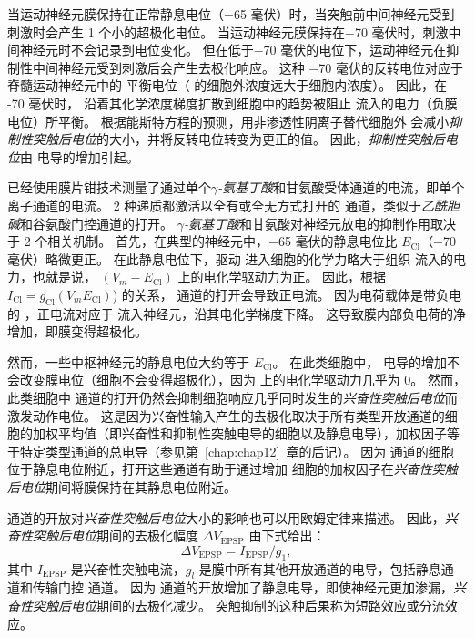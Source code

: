 当运动神经元膜保持在正常静息电位（−65 毫伏）时，当突触前中间神经元受到刺激时会产生 1 个小的超极化电位。
当运动神经元膜保持在−70 毫伏时，刺激中间神经元时不会记录到电位变化。
但在低于−70 毫伏的电位下，运动神经元在抑制性中间神经元受到刺激后会产生去极化响应。
这种 −70 毫伏的反转电位对应于脊髓运动神经元中的  平衡电位（ 的细胞外浓度远大于细胞内浓度）。
因此，在 -70 毫伏时， 沿着其化学浓度梯度扩散到细胞中的趋势被阻止  流入的电力（负膜电位）所平衡。
根据能斯特方程的预测，用非渗透性阴离子替代细胞外  会减小\textit{抑制性突触后电位}的大小，并将反转电位转变为更正的值。
因此，\textit{抑制性突触后电位}由  电导的增加引起。


已经使用膜片钳技术测量了通过单个\textit{$\gamma$-氨基丁酸}和甘氨酸受体通道的电流，即单个离子通道的电流。
2 种递质都激活以全有或全无方式打开的  通道，类似于\textit{乙酰胆碱}和谷氨酸门控通道的打开。
\textit{$\gamma$-氨基丁酸}和甘氨酸对神经元放电的抑制作用取决于 2 个相关机制。
首先，在典型的神经元中，−65 毫伏的静息电位比 $E_\text{Cl}$（−70 毫伏）略微更正。
在此静息电位下，驱动  进入细胞的化学力略大于组织  流入的电力，也就是说， $(V_m - E_\text{Cl})$ 上的电化学驱动力为正。
因此，根据 $ I_\text{Cl} = g_\text{Cl} (V_m E_\text{Cl})$) 的关系， 通道的打开会导致正电流。
因为电荷载体是带负电的 ，正电流对应于  流入神经元，沿其电化学梯度下降。
这导致膜内部负电荷的净增加，即膜变得超极化。


然而，一些中枢神经元的静息电位大约等于 $E_\text{Cl}$。
在此类细胞中， 电导的增加不会改变膜电位（细胞不会变得超极化），因为  上的电化学驱动力几乎为 0。
然而，此类细胞中  通道的打开仍然会抑制细胞响应几乎同时发生的\textit{兴奋性突触后电位}而激发动作电位。
这是因为兴奋性输入产生的去极化取决于所有类型开放通道的细胞的加权平均值（即兴奋性和抑制性突触电导的细胞以及静息电导），加权因子等于特定类型通道的总电导（参见第~\ref{chap:chap12}~章的后记）。
因为  通道的细胞位于静息电位附近，打开这些通道有助于通过增加  细胞的加权因子在\textit{兴奋性突触后电位}期间将膜保持在其静息电位附近。


 通道的开放对\textit{兴奋性突触后电位}大小的影响也可以用欧姆定律来描述。
因此，\textit{兴奋性突触后电位}期间的去极化幅度 $ \Delta V_{\text{EPSP}} $ 由下式给出：
\begin{equation}\label{depolarization_amplitude}
	\Delta V_{\text{EPSP}} = I_{\text{EPSP}} / g_1,
\end{equation}
其中 $ I_{\text{EPSP}} $ 是兴奋性突触电流，$ g_l $ 是膜中所有其他开放通道的电导，包括静息通道和传输门控  通道。
因为  通道的开放增加了静息电导，即使神经元更加渗漏，\textit{兴奋性突触后电位}期间的去极化减少。
突触抑制的这种后果称为短路效应或分流效应。


